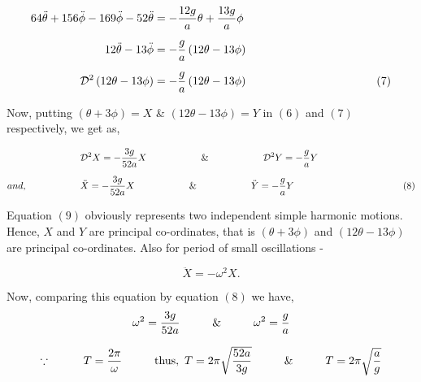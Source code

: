 \documentclass[12pt, a4paper]{article} %
\begin{document}
\begin{equation*}
    \begin{split}
        64\ddot{\theta} + 156\ddot{\phi} - 169\ddot{\phi} - 52\ddot{\theta} & = -\frac{12g}{a}\theta + \frac{13g}{a}\phi\\[2mm]
        12\ddot{\theta} - 13\ddot{\phi} & = -\frac{g}{a}\left(12\theta - 13\phi\right)\\[2mm]
        \mathcal{D}^2\left(12\theta - 13\phi\right) & = -\frac{g}{a}\left(12\theta - 13\phi\right) \hspace*{4cm}(7)
    \end{split}
\end{equation*}

Now, putting $\displaystyle \left(\theta + 3\phi\right) = X$ \& $\left(12\theta - 13\phi\right) = Y$ in $(6)$ and $(7)$ respectively, we get as,

\begin{equation*}
    \begin{split}
        & \mathcal{D}^2 X = -\frac{3g}{52a} X \hspace*{2cm} \& \hspace*{2cm} \mathcal{D}^2 Y  = -\frac{g}{a} Y \\[2mm]
        and,\hspace*{2cm} & \ddot{X} = -\frac{3g}{52a} X \hspace*{2cm} \& \hspace*{2cm} \ddot{Y}  = -\frac{g}{a} Y \hspace*{4cm}(8) 
    \end{split}
\end{equation*}

\BgThispage

Equation $(9)$ obviously represents two independent simple harmonic motions. Hence, $X$ and $Y$ are principal co-ordinates, that is $\displaystyle \left(\theta + 3\phi\right)$ and $\displaystyle \left(12\theta - 13\phi\right)$ are principal co-ordinates. Also for period of small oscillations - 

\[\ddot{X} = -\omega^2 X.\]

Now, comparing this equation by equation $(8)$ we have,
\[\omega^2 = \frac{3g}{52a}\hspace*{1cm} \& \hspace*{1cm} \omega^2 = \frac{g}{a}\]

\[\because \hspace*{1cm} T = \frac{2\pi}{\omega}\hspace*{1cm}  \mbox{thus}, \ T = 2\pi \sqrt{\frac{52a}{3g}}\hspace*{1cm} \& \hspace*{1cm} T = 2\pi \sqrt{\frac{a}{g}}\] 
\end{document}
